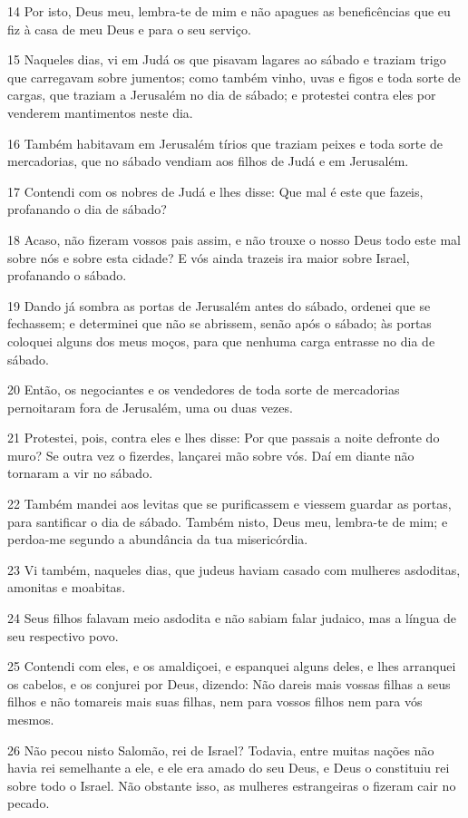 \par 14 Por isto, Deus meu, lembra-te de mim e não apagues as beneficências que eu fiz à casa de meu Deus e para o seu serviço.
\par 15 Naqueles dias, vi em Judá os que pisavam lagares ao sábado e traziam trigo que carregavam sobre jumentos; como também vinho, uvas e figos e toda sorte de cargas, que traziam a Jerusalém no dia de sábado; e protestei contra eles por venderem mantimentos neste dia.
\par 16 Também habitavam em Jerusalém tírios que traziam peixes e toda sorte de mercadorias, que no sábado vendiam aos filhos de Judá e em Jerusalém.
\par 17 Contendi com os nobres de Judá e lhes disse: Que mal é este que fazeis, profanando o dia de sábado?
\par 18 Acaso, não fizeram vossos pais assim, e não trouxe o nosso Deus todo este mal sobre nós e sobre esta cidade? E vós ainda trazeis ira maior sobre Israel, profanando o sábado.
\par 19 Dando já sombra as portas de Jerusalém antes do sábado, ordenei que se fechassem; e determinei que não se abrissem, senão após o sábado; às portas coloquei alguns dos meus moços, para que nenhuma carga entrasse no dia de sábado.
\par 20 Então, os negociantes e os vendedores de toda sorte de mercadorias pernoitaram fora de Jerusalém, uma ou duas vezes.
\par 21 Protestei, pois, contra eles e lhes disse: Por que passais a noite defronte do muro? Se outra vez o fizerdes, lançarei mão sobre vós. Daí em diante não tornaram a vir no sábado.
\par 22 Também mandei aos levitas que se purificassem e viessem guardar as portas, para santificar o dia de sábado. Também nisto, Deus meu, lembra-te de mim; e perdoa-me segundo a abundância da tua misericórdia.
\par 23 Vi também, naqueles dias, que judeus haviam casado com mulheres asdoditas, amonitas e moabitas.
\par 24 Seus filhos falavam meio asdodita e não sabiam falar judaico, mas a língua de seu respectivo povo.
\par 25 Contendi com eles, e os amaldiçoei, e espanquei alguns deles, e lhes arranquei os cabelos, e os conjurei por Deus, dizendo: Não dareis mais vossas filhas a seus filhos e não tomareis mais suas filhas, nem para vossos filhos nem para vós mesmos.
\par 26 Não pecou nisto Salomão, rei de Israel? Todavia, entre muitas nações não havia rei semelhante a ele, e ele era amado do seu Deus, e Deus o constituiu rei sobre todo o Israel. Não obstante isso, as mulheres estrangeiras o fizeram cair no pecado.
